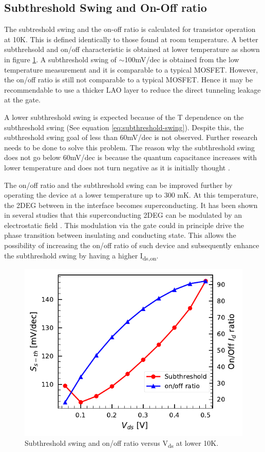 \documentclass[11pt,a4paper]{report}
\begin{document}
\subsection{Subthreshold Swing and On-Off ratio}
The subtreshold swing and the on-off ratio is calculated for transistor operation at 10K. This is defined identically to those found at room temperature. A better subthrehsold and on/off characteristic is obtained at lower temperature as shown in figure \ref{fig:lowT_subth}. A subthreshold swing of $\sim$100mV/dec is obtained from the low temperature measurement and it is comparable to a typical MOSFET. However, the on/off ratio is still not comparable to a typical MOSFET. Hence it may be recommendable to use a thicker LAO layer to reduce the direct tunneling leakage at the gate. 

A lower subthreshold swing is expected because of the T dependence on the subthreshold swing (See equation \ref{eq:subthreshold-swing}). Despite this, the subthreshold swing goal of less than 60mV/dec is not observed. Further research needs to be done to solve this problem. The reason why the subthreshold swing does not go below 60mV/dec is because the quantum capacitance increases with lower temperature and does not turn negative as it is initially thought \cite{li_Large_capacitance_enhancement_2011}.

The on/off ratio and the subthreshold swing can be improved further by operating the device at a lower temperature up to 300 mK. At this temperature, the 2DEG between in the interface becomes superconducting. It has been shown in several studies that this superconducting 2DEG can be modulated by an electrostatic field \cite{caviglia}. This modulation via the gate could in principle drive the phase transition between insulating and conducting state. This allows the possibility of increasing the on/off ratio of such device and subsequently enhance the subthreshold swing by having a higher I\textsubscript{ds,on}.


\begin{figure}[!h]
    \centering
    \includegraphics{Figures/LowT/Dev16_lowT_Subth-on-off.pdf}
    \caption{Subthreshold swing and on/off ratio versus V\textsubscript{ds} at lower 10K.}
    \label{fig:lowT_subth}
\end{figure}
\end{document}
